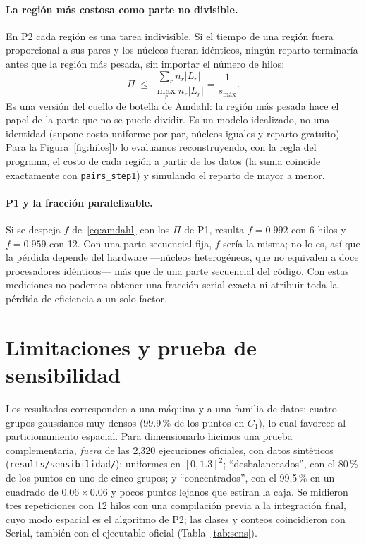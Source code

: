 \documentclass[11pt,letterpaper]{article}
\newcommand{\code}[1]{\texttt{#1}}
\newcommand{\smax}{s_{\text{máx}}}
\begin{document}
\paragraph{La región más costosa como parte no divisible.} En P2 cada región es una tarea indivisible. Si el tiempo de
una región fuera proporcional a sus pares y los núcleos fueran idénticos, ningún reparto terminaría antes que la
región más pesada, sin importar el número de hilos:
\begin{equation}\label{eq:cota}
  \Pi\;\le\;\frac{\sum_r n_r|L_r|}{\max_r n_r|L_r|}=\frac{1}{\smax}.
\end{equation}
Es una versión del cuello de botella de Amdahl: la región más pesada hace el papel de la parte que no se puede
dividir. Es un modelo idealizado, no una identidad (supone costo uniforme por par, núcleos iguales y reparto
gratuito). Para la Figura~\ref{fig:hilos}b lo evaluamos reconstruyendo, con la regla del programa, el costo de cada
región a partir de los datos (la suma coincide exactamente con \code{pairs\_step1}) y simulando el reparto de mayor a
menor.

\paragraph{P1 y la fracción paralelizable.} Si se despeja $f$ de~\eqref{eq:amdahl} con los $\Pi$ de P1, resulta
$f=0.992$ con 6 hilos y $f=0.959$ con 12. Con una parte secuencial fija, $f$ sería la misma; no lo es, así que la
pérdida depende del hardware ---núcleos heterogéneos, que no equivalen a doce procesadores idénticos--- más que de
una parte secuencial del código. Con estas mediciones no podemos obtener una fracción serial exacta ni atribuir toda
la pérdida de eficiencia a un solo factor.

\section{Limitaciones y prueba de sensibilidad}\label{sec:limites}

Los resultados corresponden a una máquina y a una familia de datos: cuatro grupos gaussianos muy densos (99.9\,\% de
los puntos en $C_1$), lo cual favorece al particionamiento espacial. Para dimensionarlo hicimos una prueba
complementaria, \emph{fuera} de las 2,320 ejecuciones oficiales, con datos sintéticos (\code{results/sensibilidad/}):
uniformes en $[0,1.3]^2$; ``desbalanceados'', con el 80\,\% de los puntos en uno de cinco grupos; y
``concentrados'', con el 99.5\,\% en un cuadrado de $0.06\times0.06$ y pocos puntos lejanos que estiran la caja. Se
midieron tres repeticiones con 12 hilos con una compilación previa a la integración final, cuyo modo espacial es el
algoritmo de P2; las clases y conteos coincidieron con Serial, también con el ejecutable oficial
(Tabla~\ref{tab:sens}).
\end{document}
